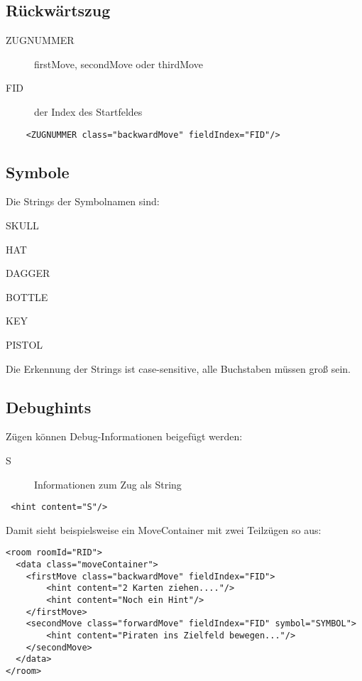 \documentclass[12pt,a4paper, ngerman, oneside]{scrartcl}
\begin{document}
\subsection{Rückwärtszug}
\label{backwardMove}
\begin{description}
\item[ZUGNUMMER] firstMove, secondMove oder thirdMove
\item[FID] der Index des Startfeldes
\end{description}
\begin{verbatim}
	<ZUGNUMMER class="backwardMove" fieldIndex="FID"/>
\end{verbatim}


\subsection{\label{stoneSymbols}Symbole}

Die Strings der Symbolnamen sind:
\begin{compactenum}
\item SKULL
\item HAT
\item DAGGER
\item BOTTLE
\item KEY
\item PISTOL
\end{compactenum}
Die Erkennung der Strings ist case-sensitive, alle Buchstaben müssen groß
sein.
\subsection{Debughints}
Zügen können Debug-Informationen beigefügt werden:
\begin{description}
\item[S] Informationen zum Zug als String
\end{description}
\begin{verbatim}
 <hint content="S"/>
\end{verbatim}
Damit sieht beispielsweise ein MoveContainer mit zwei Teilzügen so aus:
\begin{verbatim}
<room roomId="RID">
  <data class="moveContainer">
    <firstMove class="backwardMove" fieldIndex="FID">
     	<hint content="2 Karten ziehen...."/>
     	<hint content="Noch ein Hint"/>
    </firstMove>
    <secondMove class="forwardMove" fieldIndex="FID" symbol="SYMBOL">
    	<hint content="Piraten ins Zielfeld bewegen..."/>
    </secondMove>
  </data>
</room>
\end{verbatim}
\end{document}
